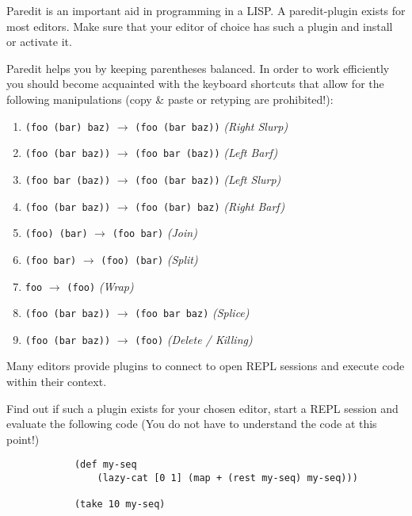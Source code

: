 \documentclass[11pt,a4paper]{article}
\begin{document}
	
	\begin{exercise}[Paredit]
		Paredit is an important aid in programming in a LISP.
		A paredit-plugin exists for most editors.
		Make sure that your editor of choice has such a plugin
		and install or activate it.
		
		
		Paredit helps you by keeping parentheses balanced.
		In order to work efficiently you should
		become acquainted with the keyboard shortcuts that allow for the following manipulations
		(copy \& paste or retyping are prohibited!):
		
		\begin{enumerate}[label=\alph*)]
			\item
			\texttt{(foo (bar) baz)} $\longrightarrow$ \texttt{(foo (bar baz))} \textit{(Right Slurp)}
			\item
			\texttt{(foo (bar baz))} $\longrightarrow$ \texttt{(foo bar (baz))} \textit{(Left Barf)}
			\item
			\texttt{(foo bar (baz))} $\longrightarrow$ \texttt{(foo (bar baz))} \textit{(Left Slurp)}
			\item
			\texttt{(foo (bar baz))} $\longrightarrow$ \texttt{(foo (bar) baz)} \textit{(Right Barf)}
			\item
			\texttt{(foo) (bar)} $\longrightarrow$ \texttt{(foo bar)} \textit{(Join)}
			\item
			\texttt{(foo bar)} $\longrightarrow$ \texttt{(foo) (bar)} \textit{(Split)}
			\item
			\texttt{foo} $\longrightarrow$ \texttt{(foo)} \textit{(Wrap)}
			\item
			\texttt{(foo (bar baz))} $\longrightarrow$ \texttt{(foo bar baz)} \textit{(Splice)}
			\item
			\texttt{(foo (bar baz))} $\longrightarrow$ \texttt{(foo)} \textit{(Delete / Killing)}
		\end{enumerate}
		
	\end{exercise}
	
	\begin{exercise}
		Many editors provide plugins
		to connect to open REPL sessions
		and execute code within their context.
		
		Find out if such a plugin exists for your chosen editor,
		start a REPL session and evaluate the following
		code (You do not have to understand the code at this point!)
		
		\begin{verbatim}
			(def my-seq
			    (lazy-cat [0 1] (map + (rest my-seq) my-seq)))
			
			(take 10 my-seq)
		\end{verbatim}
	\end{exercise}
\end{document}
